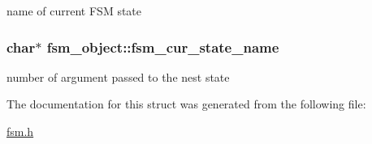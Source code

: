 \label{structfsm__object_ad5eb19f825d8f434149e720ad6d0fa4a}
name of current FSM state \hypertarget{structfsm__object_aec65222e985afecb031f8d04646f8d6d}{
\subsubsection[{fsm\_\-cur\_\-state\_\-name}]{\setlength{\rightskip}{0pt plus 5cm}char$\ast$ {\bf fsm\_\-object::fsm\_\-cur\_\-state\_\-name}}}
\label{structfsm__object_aec65222e985afecb031f8d04646f8d6d}
number of argument passed to the nest state 

The documentation for this struct was generated from the following file:\begin{DoxyCompactItemize}
\item 
\hyperlink{fsm_8h}{fsm.h}\end{DoxyCompactItemize}
